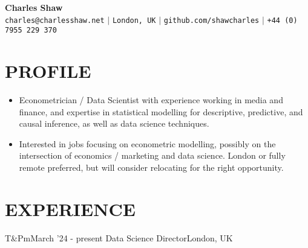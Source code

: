 \documentclass[letterpaper,11pt]{article}
\begin{document}
\begin{center}
    \textbf{\Huge Charles Shaw} \\ \vspace{15pt}
\small 
\hspace{1pt} \faEnvelope \hspace{1pt} \texttt{charles@charlesshaw.net} \hspace{1pt} $|$
\hspace{1pt} \faMapMarker* \hspace{1pt}\texttt{London, UK}  \hspace{1pt} $|$
\hspace{1pt} \faGithub \hspace{1pt} \texttt{github.com/shawcharles} \hspace{1pt} $|$
\hspace{1pt} \faPhone \hspace{1pt} \texttt{+44 (0) 7955 229 370} \hspace{1pt}
\end{center}

\section{PROFILE}

\begin{itemize}
\item Econometrician / Data Scientist with experience working in media and finance, and expertise in statistical modelling for descriptive, predictive, and causal inference, as well as data science techniques.
\item Interested in jobs focusing on econometric modelling, possibly on the intersection of economics / marketing and data science. London or fully remote preferred, but will consider relocating for the right opportunity. 

\end{itemize}
     
\section{EXPERIENCE}
\resumeSubHeadingListStart

\resumeSubheading
{T\&Pm}{March '24 - present}
{Data Science Director}{London, UK}
\resumeItemListStart
{}
\resumeItemListEnd
\end{document}
